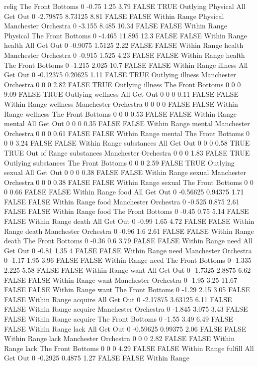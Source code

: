 relig The Front Bottoms 0 -0.75 1.25 3.79 FALSE TRUE Outlying
Physical All Get Out 0 -2.79875 8.73125 8.81 FALSE FALSE Within Range
Physical Manchester Orchestra 0 -3.155 8.485 10.34 FALSE FALSE Within Range
Physical The Front Bottoms 0 -4.465 11.895 12.3 FALSE FALSE Within Range
health All Get Out 0 -0.9075 1.5125 2.22 FALSE FALSE Within Range
health Manchester Orchestra 0 -0.915 1.525 4.23 FALSE FALSE Within Range
health The Front Bottoms 0 -1.215 2.025 10.7 FALSE FALSE Within Range
illness All Get Out 0 -0.12375 0.20625 1.11 FALSE TRUE Outlying
illness Manchester Orchestra 0 0 0 2.82 FALSE TRUE Outlying
illness The Front Bottoms 0 0 0 9.09 FALSE TRUE Outlying
wellness All Get Out 0 0 0 0.11 FALSE FALSE Within Range
wellness Manchester Orchestra 0 0 0 0 FALSE FALSE Within Range
wellness The Front Bottoms 0 0 0 0.53 FALSE FALSE Within Range
mental All Get Out 0 0 0 0.35 FALSE FALSE Within Range
mental Manchester Orchestra 0 0 0 0.61 FALSE FALSE Within Range
mental The Front Bottoms 0 0 0 3.24 FALSE FALSE Within Range
substances All Get Out 0 0 0 0.58 TRUE TRUE Out of Range
substances Manchester Orchestra 0 0 0 1.83 FALSE TRUE Outlying
substances The Front Bottoms 0 0 0 2.59 FALSE TRUE Outlying
sexual All Get Out 0 0 0 0.38 FALSE FALSE Within Range
sexual Manchester Orchestra 0 0 0 0.38 FALSE FALSE Within Range
sexual The Front Bottoms 0 0 0 0.66 FALSE FALSE Within Range
food All Get Out 0 -0.56625 0.94375 1.71 FALSE FALSE Within Range
food Manchester Orchestra 0 -0.525 0.875 2.61 FALSE FALSE Within Range
food The Front Bottoms 0 -0.45 0.75 5.14 FALSE FALSE Within Range
death All Get Out 0 -0.99 1.65 4.72 FALSE FALSE Within Range
death Manchester Orchestra 0 -0.96 1.6 2.61 FALSE FALSE Within Range
death The Front Bottoms 0 -0.36 0.6 3.79 FALSE FALSE Within Range
need All Get Out 0 -0.81 1.35 4 FALSE FALSE Within Range
need Manchester Orchestra 0 -1.17 1.95 3.96 FALSE FALSE Within Range
need The Front Bottoms 0 -1.335 2.225 5.58 FALSE FALSE Within Range
want All Get Out 0 -1.7325 2.8875 6.62 FALSE FALSE Within Range
want Manchester Orchestra 0 -1.95 3.25 11.67 FALSE FALSE Within Range
want The Front Bottoms 0 -1.29 2.15 3.05 FALSE FALSE Within Range
acquire All Get Out 0 -2.17875 3.63125 6.11 FALSE FALSE Within Range
acquire Manchester Orchestra 0 -1.845 3.075 3.43 FALSE FALSE Within Range
acquire The Front Bottoms 0 -1.55 3.49 6.49 FALSE FALSE Within Range
lack All Get Out 0 -0.59625 0.99375 2.06 FALSE FALSE Within Range
lack Manchester Orchestra 0 0 0 2.82 FALSE FALSE Within Range
lack The Front Bottoms 0 0 0 4.29 FALSE FALSE Within Range
fulfill All Get Out 0 -0.2925 0.4875 1.27 FALSE FALSE Within Range
